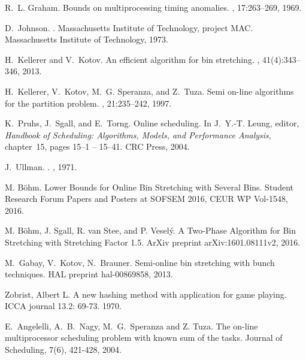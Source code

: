 \begin{thebibliography}{99}
R.~L. Graham.
\newblock Bounds on multiprocessing timing anomalies.
, 17:263--269, 1969.

D.~Johnson.
.
\newblock Massachusetts Institute of Technology, project MAC. Massachusetts
  Institute of Technology, 1973.

H.~Kellerer and V.~Kotov.
\newblock An efficient algorithm for bin stretching.
, 41(4):343--346, 2013.

H.~Kellerer, V.~Kotov, M.~G. Speranza, and Z.~Tuza.
\newblock Semi on-line algorithms for the partition problem.
, 21:235--242, 1997.

K.~Pruhs, J.~Sgall, and E.~Torng.
\newblock Online scheduling.
\newblock In J.~Y.-T. Leung, editor, {\em Handbook of Scheduling:
  {Algorithms}, Models, and Performance Analysis}, chapter~15, pages 15--1 --
  15--41. CRC Press, 2004.

J.~Ullman.
.
, 1971.

M. Böhm.
\newblock Lower Bounds for Online Bin Stretching with Several Bins.
\newblock Student Research Forum Papers and Posters at SOFSEM 2016, CEUR WP Vol-1548,
2016.

M. Böhm, J. Sgall, R. van Stee, and P. Veselý. 
\newblock A Two-Phase Algorithm for Bin Stretching with Stretching Factor 1.5.
\newblock ArXiv preprint arXiv:1601.08111v2,
2016.

M.~Gabay, V.~Kotov, N.~Brauner.
\newblock Semi-online bin stretching with bunch techniques.
\newblock HAL preprint hal-00869858,
2013.

Zobrist, Albert L.
\newblock A new hashing method with application for game playing.
\newblock ICCA journal 13.2: 69-73.
1970.

E.~Angelelli, A.~B.~Nagy, M.~G.~Speranza and Z. Tuza.
\newblock The on-line multiprocessor scheduling problem with known sum of the tasks.
\newblock Journal of Scheduling, 7(6), 421-428,
2004.

\end{thebibliography}